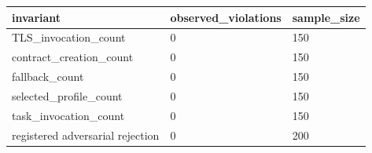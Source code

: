 \begin{tabular}{lll}
invariant & observed\_violations & sample\_size \\
\hline
TLS\_invocation\_count & 0 & 150 \\
contract\_creation\_count & 0 & 150 \\
fallback\_count & 0 & 150 \\
selected\_profile\_count & 0 & 150 \\
task\_invocation\_count & 0 & 150 \\
registered adversarial rejection & 0 & 200 \\
\end{tabular}
